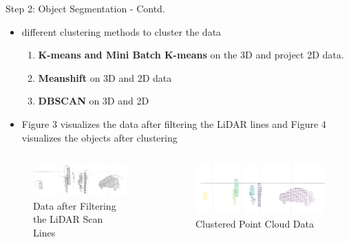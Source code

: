 \documentclass[9pt]{beamer}
\begin{document}
\begin{frame}[fragile]{Step 2: Object Segmentation - Contd. }
	\begin{itemize}
		\item {} different clustering methods to cluster the data
		\begin{enumerate}
			\item \textbf{K-means and Mini Batch K-means} on the 3D and project 2D data.
			\item \textbf{Meanshift} on 3D and 2D data
			\item \textbf{DBSCAN} on 3D and 2D
		\end{enumerate}
		\item Figure 3 visualizes the data after filtering the LiDAR lines and Figure 4 visualizes the objects after clustering
	\end{itemize}

	\begin{columns}
		\begin{column}{0.48\textwidth}
			\begin{figure}
				\centering
				\includegraphics[width=\textwidth]{images/ground_after2.png}
				\caption{Data after Filtering the LiDAR Scan Lines}
			\end{figure}
		\end{column}
		\begin{column}{0.48\textwidth}
			\begin{figure}
				\centering
				\includegraphics[width=\textwidth]{images/seg_noise_removal.png}		
				\caption{Clustered Point Cloud Data}
			\end{figure}
		\end{column}
	\end{columns}

\end{frame}
\end{document}
